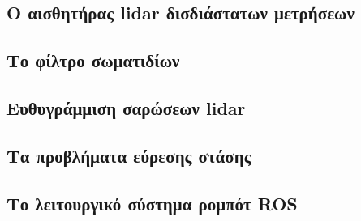 \subsection{Ο αισθητήρας lidar δισδιάστατων μετρήσεων}
\subsection{Το φίλτρο σωματιδίων}
\subsection{Ευθυγράμμιση σαρώσεων lidar}
\subsection{Τα προβλήματα εύρεσης στάσης}
\subsection{Το λειτουργικό σύστημα ρομπότ ROS}
